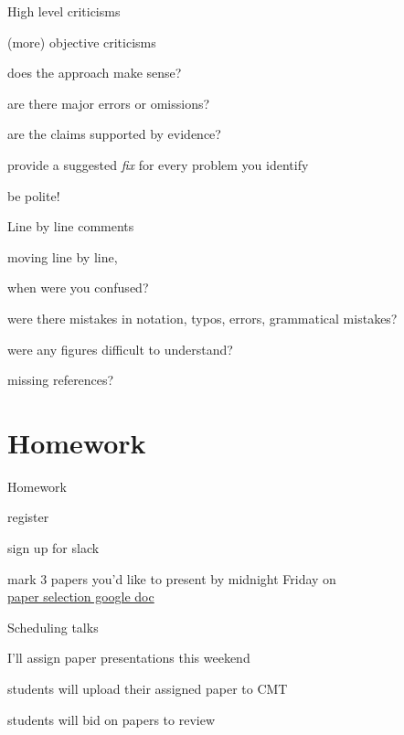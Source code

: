 \documentclass[presentation,xcolor={usenames,dvipsnames}]{beamer}
\begin{document}
\begin{frame}{High level criticisms}

(more) objective criticisms
\bit
\item does the approach make sense?
\item are there major errors or omissions?
\item are the claims supported by evidence?
\item provide a suggested \emph{fix} for every problem you identify
\item be polite!
\eit

\end{frame}

\begin{frame}{Line by line comments}

moving line by line,
\bit
\item when were you confused?
\item were there mistakes in notation, typos, errors, grammatical mistakes?
\item were any figures difficult to understand?
\item missing references?
\eit

\end{frame}

\section{Homework}

\begin{frame}{Homework}

\bit
\item register
\item sign up for slack
\item mark 3 papers you'd like to present by midnight Friday on \\
\href{https://docs.google.com/spreadsheets/d/1eSJn0_ANEXfOsZZrYwHoQ6F00FKBLz4olbKVtOLoE40}{paper selection google doc}
\eit

\end{frame}

\begin{frame}{Scheduling talks}

\bit
\item I'll assign paper presentations this weekend
\item students will upload their assigned paper to CMT
\item students will bid on papers to review
\eit

\end{frame}
\end{document}
